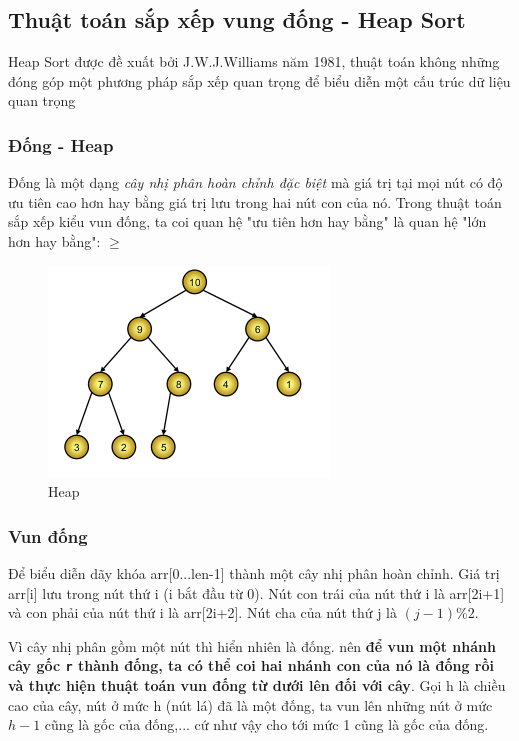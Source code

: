 \documentclass[8pt, a4paper]{article}
\begin{document}
\subsection{Thuật toán sắp xếp vung đống - Heap Sort}

Heap Sort được đề xuất bởi J.W.J.Williams năm 1981, thuật toán không những đóng góp một phương pháp sắp xếp quan trọng để biểu diễn một cấu trúc dữ liệu quan trọng 

\subsubsection{Đống - Heap}
Đống là một dạng \emph{cây nhị phân hoàn chỉnh đặc biệt} mà giá trị tại mọi nút có độ ưu tiên cao hơn hay bằng giá trị lưu trong hai nút con của nó. Trong thuật toán sắp xếp kiểu vun đống, ta coi quan hệ "ưu tiên hơn hay bằng" là quan hệ "lớn hơn hay bằng": $ \ge $
\begin{figure}[htb]
\centering
\includegraphics[scale=0.5]{img/heaptree.png}
\caption{Heap}
\label{HeapTree}
\end{figure}

\subsubsection{Vun đống}

Để biểu diễn dãy khóa arr[0...len-1] thành một cây nhị phân hoàn chỉnh. Giá trị arr[i] lưu trong nút thứ i (i bắt đầu từ 0). Nút con trái của nút thứ i là arr[2i+1] và con phải của nút thứ i là arr[2i+2]. Nút cha của nút thứ j là $(j-1) \% 2$.

Vì cây nhị phân gồm một nút thì hiển nhiên là đống. nên \textbf{để vun một nhánh cây gốc \texttt{r} thành đống, ta có thể coi hai nhánh con của nó là đống rồi và thực hiện thuật toán vun đống từ dưới lên đối với cây}. Gọi h là chiều cao của cây, nút ở mức h (nút lá) đã là một đống, ta vun lên những nút ở mức $h-1$ cũng là gốc của đống,... cứ như vậy cho tới mức 1 cũng là gốc của đống.
\end{document}
